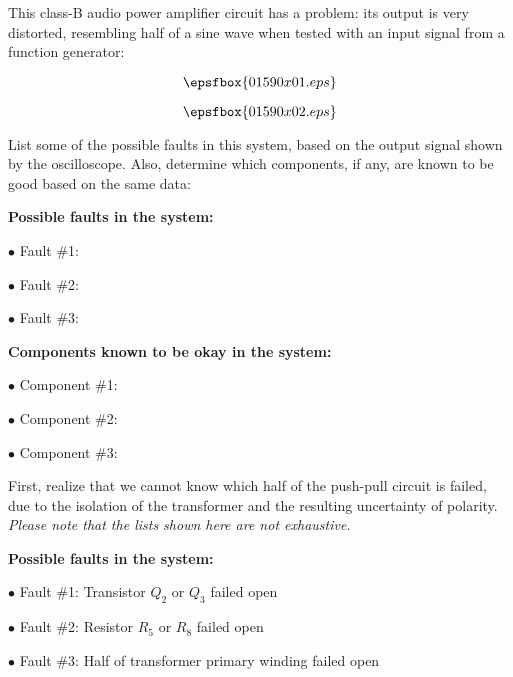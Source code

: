 

This class-B audio power amplifier circuit has a problem: its output is very distorted, resembling half of a sine wave when tested with an input signal from a function generator:

$$\epsfbox{01590x01.eps}$$

$$\epsfbox{01590x02.eps}$$

List some of the possible faults in this system, based on the output signal shown by the oscilloscope.  Also, determine which components, if any, are known to be good based on the same data:

\goodbreak

\medskip
\item{} {\bf Possible faults in the system:}
\item{$\bullet$} Fault \#1:
\item{$\bullet$} Fault \#2:
\item{$\bullet$} Fault \#3:
\medskip

\vskip 10pt

\medskip
\item{} {\bf Components known to be okay in the system:}
\item{$\bullet$} Component \#1:
\item{$\bullet$} Component \#2:
\item{$\bullet$} Component \#3:
\medskip








First, realize that we cannot know which half of the push-pull circuit is failed, due to the isolation of the transformer and the resulting uncertainty of polarity.  {\it Please note that the lists shown here are not exhaustive.}

\medskip
\item{} {\bf Possible faults in the system:}
\item{$\bullet$} Fault \#1: Transistor $Q_2$ or $Q_3$ failed open
\item{$\bullet$} Fault \#2: Resistor $R_5$ or $R_8$ failed open
\item{$\bullet$} Fault \#3: Half of transformer primary winding failed open
\medskip

